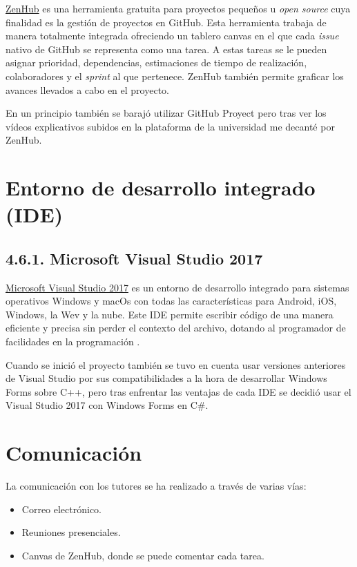 \href{https://www.zenhub.com/}{ZenHub} es una herramienta gratuita para proyectos pequeños u \textit{open source} cuya finalidad es la gestión de proyectos en GitHub. Esta herramienta trabaja de manera totalmente integrada ofreciendo un tablero canvas en el que cada \textit{issue} nativo de GitHub se representa como una tarea. A estas tareas se le pueden asignar prioridad, dependencias, estimaciones de tiempo de realización, colaboradores y el \textit{sprint} al que pertenece. ZenHub también permite graficar los avances llevados a cabo en el proyecto.


En un principio también se barajó utilizar GitHub Proyect pero tras ver los vídeos explicativos subidos en la plataforma de la universidad me decanté por ZenHub.

\section{Entorno de desarrollo integrado (IDE)}

\subsection{4.6.1. Microsoft Visual Studio 2017}

\href{https://visualstudio.microsoft.com/es/vs/}{Microsoft Visual Studio 2017} es un entorno de desarrollo integrado para sistemas operativos Windows y macOs con todas las características para Android, iOS, Windows, la Wev y la nube. Este IDE permite escribir código de una manera eficiente y precisa sin perder el contexto del archivo, dotando al programador de facilidades en la programación \cite{web:visualstudio}.


Cuando se inició el proyecto también se tuvo en cuenta usar versiones anteriores de Visual Studio por sus compatibilidades a la hora de desarrollar Windows Forms sobre C++, pero tras enfrentar las ventajas de cada IDE se decidió usar el Visual Studio 2017 con Windows Forms en C\#.

\section{Comunicación}

La comunicación con los tutores se ha realizado a través de varias vías:
\begin{itemize}
	\item Correo electrónico.
	\item Reuniones presenciales. 
	\item Canvas de ZenHub, donde se puede comentar cada tarea.
\end{itemize}

